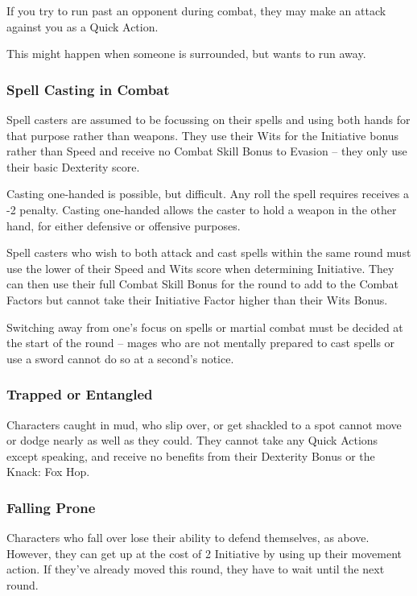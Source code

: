 \begin{multicols}{2}
If you try to run past an opponent during combat, they may make an attack against you as a Quick Action.

This might happen when someone is surrounded, but wants to run away.

\subsubsection{Spell Casting in Combat}

Spell casters are assumed to be focussing on their spells and using both hands for that purpose rather than weapons. They use their Wits for the Initiative bonus rather than Speed and receive no Combat Skill Bonus to Evasion -- they only use their basic Dexterity score.

Casting one-handed is possible, but difficult.
Any roll the spell requires receives a -2 penalty.
Casting one-handed allows the caster to hold a weapon in the other hand, for either defensive or offensive purposes.

Spell casters who wish to both attack and cast spells within the same \gls{round} must use the lower of their Speed and Wits score when determining Initiative. They can then use their full Combat Skill Bonus for the \gls{round} to add to the Combat Factors but cannot take their Initiative Factor higher than their Wits Bonus.

Switching away from one's focus on spells or martial combat must be decided at the start of the \gls{round} -- mages who are not mentally prepared to cast spells or use a sword cannot do so at a second's notice.

\subsubsection{Trapped or Entangled}

Characters caught in mud, who slip over, or get shackled to a spot cannot move or dodge nearly as well as they could.
They cannot take any Quick Actions except speaking, and receive no benefits from their Dexterity Bonus or the Knack: Fox Hop.

\subsubsection{Falling Prone}\label{prone}

Characters who fall over lose their ability to defend themselves, as above.  However, they can get up at the cost of 2 Initiative by using up their movement action.  If they've already moved this \gls{round}, they have to wait until the next \gls{round}.


\end{multicols}
